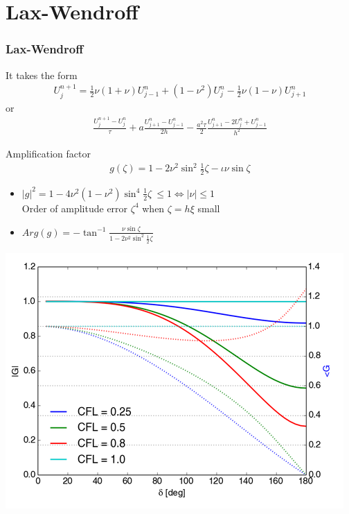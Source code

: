\documentclass{beamer}
\begin{document}
\section{Lax-Wendroff}
\begin{frame}
\frametitle{Lax-Wendroff}
It takes the form
\begin{align*}
U_j^{n+1} = \frac{1}{2}\nu(1 + \nu)U_{j-1}^n + (1 - \nu^2)U_j^n - \frac{1}{2}\nu(1 - \nu)U_{j+1}^n
\end{align*}
or
\begin{align*}
\frac{U_j^{n+1} - U_j^n}{\tau} + a \frac{U_{j+1}^n -U_{j-1}^n}{2h} -\frac{a^2\tau}{2}\frac{U_{j+1}^n -2U_j^n+U_{j-1}^n}{h^2}
\end{align*}
\end{frame}
\begin{frame}
Amplification factor
\begin{align*}
g(\zeta) = 1 - 2 \nu^2\sin^2{\frac{1}{2}\zeta} - \iota \nu \sin{\zeta}
\end{align*}
\begin{itemize}
\setlength\itemsep{1em}
\item $|g|^2 = 1 - 4\nu^2(1-\nu^2)\sin^4{\frac{1}{2}\zeta} \ \leq 1 \iff |\nu| \leq 1$ \\ Order of amplitude error $\zeta^4$ when $\zeta = h\xi$ small
\item $Arg(g) = \displaystyle{-\tan^{-1}{\frac{\nu \sin{\zeta}}{1 - 2\nu^2\sin^2{\frac{1}{2}\zeta}}}}$
\end{itemize}
\end{frame}
\begin{frame}
\cite{ebook}
\includegraphics[width=\textwidth]{lw_g}
\end{frame}
\end{document}
